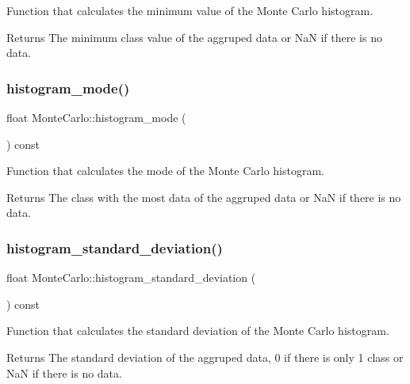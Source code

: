 Function that calculates the minimum value of the Monte Carlo histogram. \begin{DoxyReturn}{Returns}
The minimum class value of the aggruped data or NaN if there is no data. 
\end{DoxyReturn}
\mbox{\label{classMonteCarlo_a88e6309c74bb2e935dba5e4b7682da5b}} 
\subsubsection{\texorpdfstring{histogram\+\_\+mode()}{histogram\_mode()}}
{\footnotesize\ttfamily float Monte\+Carlo\+::histogram\+\_\+mode (\begin{DoxyParamCaption}{ }\end{DoxyParamCaption}) const}

Function that calculates the mode of the Monte Carlo histogram. \begin{DoxyReturn}{Returns}
The class with the most data of the aggruped data or NaN if there is no data. 
\end{DoxyReturn}
\mbox{\label{classMonteCarlo_ab54725f0438b5ba9eeefdf60efd23577}} 
\subsubsection{\texorpdfstring{histogram\+\_\+standard\+\_\+deviation()}{histogram\_standard\_deviation()}}
{\footnotesize\ttfamily float Monte\+Carlo\+::histogram\+\_\+standard\+\_\+deviation (\begin{DoxyParamCaption}{ }\end{DoxyParamCaption}) const}

Function that calculates the standard deviation of the Monte Carlo histogram. \begin{DoxyReturn}{Returns}
The standard deviation of the aggruped data, 0 if there is only 1 class or NaN if there is no data. 
\end{DoxyReturn}
\mbox{\label{classMonteCarlo_a40ba8a0aaa4d03aa64571fe29f61049a}} 
